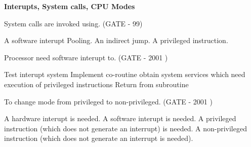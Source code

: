 
\centerline{\textbf{ \LARGE Interupts, System calls, CPU Modes}}



\begin{questyle}

  \question System calls are invoked using. (GATE - 99)

  \begin{oneparchoices}
    \CorrectChoice A software interupt
    \choice Pooling.
    \choice An indirect jump.
    \choice A privileged instruction.
  \end{oneparchoices}

    \end{questyle}





\begin{questyle}

  \question Processor need software interupt to. (GATE - 2001 )

  \begin{choices}
    \choice Test interupt system
    \choice Implement co-routine
    \CorrectChoice obtain system services which need execution of privileged instructions
    \choice Return from subroutine
  \end{choices}

  \end{questyle}




\begin{questyle}

  \question To change mode from privileged to non-privileged. (GATE - 2001 )

  \begin{choices}
    \choice A hardware interupt is needed.
    \choice A software interupt is needed.
    \choice A privileged instruction (which does not generate an interrupt) is needed.
    \CorrectChoice A non-privileged instruction (which does not generate an interrupt is needed).
  \end{choices}

  \end{questyle}




